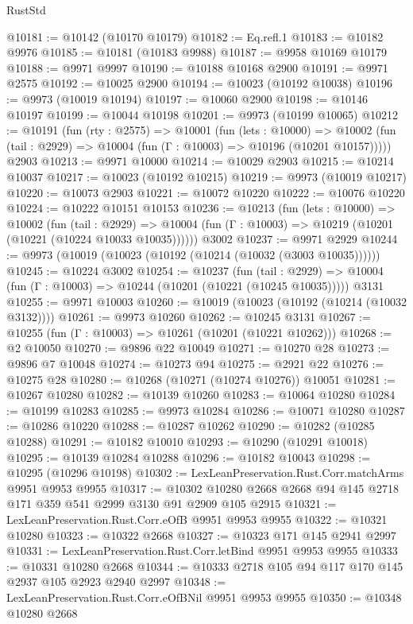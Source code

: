 \begin{lexlean}{RustStd}
\begin{coremodule}
@10181 := @10142 (@10170 @10179)
@10182 := Eq.refl.{1}
@10183 := @10182 @9976
@10185 := @10181 (@10183 @9988)
@10187 := @9958 @10169 @10179
@10188 := @9971 @9997
@10190 := @10188 @10168 @2900
@10191 := @9971 @2575
@10192 := @10025 @2900
@10194 := @10023 (@10192 @10038)
@10196 := @9973 (@10019 @10194)
@10197 := @10060 @2900
@10198 := @10146 @10197
@10199 := @10044 @10198
@10201 := @9973 (@10199 @10065)
@10212 := @10191
    (fun (rty : @2575) =>
    @10001
      (fun (lets : @10000) =>
      @10002 (fun (tail : @2929) => @10004 (fun (Γ : @10003) => @10196 (@10201 @10157)))))
    @2903
@10213 := @9971 @10000
@10214 := @10029 @2903
@10215 := @10214 @10037
@10217 := @10023 (@10192 @10215)
@10219 := @9973 (@10019 @10217)
@10220 := @10073 @2903
@10221 := @10072 @10220
@10222 := @10076 @10220
@10224 := @10222 @10151 @10153
@10236 := @10213
    (fun (lets : @10000) =>
    @10002
      (fun (tail : @2929) =>
      @10004 (fun (Γ : @10003) => @10219 (@10201 (@10221 (@10224 @10033 @10035))))))
    @3002
@10237 := @9971 @2929
@10244 := @9973 (@10019 (@10023 (@10192 (@10214 (@10032 (@3003 @10035))))))
@10245 := @10224 @3002
@10254 := @10237
    (fun (tail : @2929) => @10004 (fun (Γ : @10003) => @10244 (@10201 (@10221 (@10245 @10035)))))
    @3131
@10255 := @9971 @10003
@10260 := @10019 (@10023 (@10192 (@10214 (@10032 @3132))))
@10261 := @9973 @10260
@10262 := @10245 @3131
@10267 := @10255 (fun (Γ : @10003) => @10261 (@10201 (@10221 @10262)))
@10268 := @2 @10050
@10270 := @9896 @22 @10049
@10271 := @10270 @28
@10273 := @9896 @7 @10048
@10274 := @10273 @94
@10275 := @2921 @22
@10276 := @10275 @28
@10280 := @10268 (@10271 (@10274 @10276)) @10051
@10281 := @10267 @10280
@10282 := @10139 @10260
@10283 := @10064 @10280
@10284 := @10199 @10283
@10285 := @9973 @10284
@10286 := @10071 @10280
@10287 := @10286 @10220
@10288 := @10287 @10262
@10290 := @10282 (@10285 @10288)
@10291 := @10182 @10010
@10293 := @10290 (@10291 @10018)
@10295 := @10139 @10284 @10288
@10296 := @10182 @10043
@10298 := @10295 (@10296 @10198)
@10302 := LexLeanPreservation.Rust.Corr.matchArms @9951 @9953 @9955
@10317 := @10302 @10280 @2668 @2668 @94 @145 @2718 @171 @359 @541 @2999 @3130 @91 @2909 @105 @2915
@10321 := LexLeanPreservation.Rust.Corr.eOfB @9951 @9953 @9955
@10322 := @10321 @10280
@10323 := @10322 @2668
@10327 := @10323 @171 @145 @2941 @2997
@10331 := LexLeanPreservation.Rust.Corr.letBind @9951 @9953 @9955
@10333 := @10331 @10280 @2668
@10344 := @10333 @2718 @105 @94 @117 @170 @145 @2937 @105 @2923 @2940 @2997
@10348 := LexLeanPreservation.Rust.Corr.eOfBNil @9951 @9953 @9955
@10350 := @10348 @10280 @2668

\end{coremodule}
\end{lexlean}
